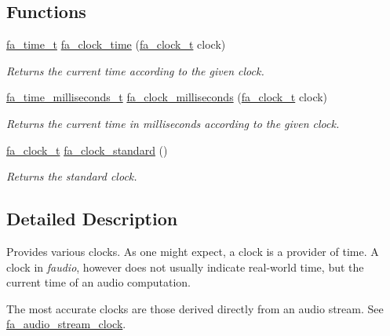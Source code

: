 \subsection*{Functions}
\begin{DoxyCompactItemize}
\item 
\hyperlink{group___fa_time_ga227cc693f20b4873fed11028bcade184}{fa\-\_\-time\-\_\-t} \hyperlink{group___fa_clock_ga18d53d2bcd2ff1618760b9960e40d56d}{fa\-\_\-clock\-\_\-time} (\hyperlink{group___fa_clock_ga20b3a0f49788fbedba140b1d315d2313}{fa\-\_\-clock\-\_\-t} clock)
\begin{DoxyCompactList}\small\item\em Returns the current time according to the given clock. \end{DoxyCompactList}\item 
\hyperlink{group___fa_time_gadebdebeab6c5ba7cd8002d0773635e61}{fa\-\_\-time\-\_\-milliseconds\-\_\-t} \hyperlink{group___fa_clock_gad09133a7293cd31a05d99b8915546a4a}{fa\-\_\-clock\-\_\-milliseconds} (\hyperlink{group___fa_clock_ga20b3a0f49788fbedba140b1d315d2313}{fa\-\_\-clock\-\_\-t} clock)
\begin{DoxyCompactList}\small\item\em Returns the current time in milliseconds according to the given clock. \end{DoxyCompactList}\item 
\hyperlink{group___fa_clock_ga20b3a0f49788fbedba140b1d315d2313}{fa\-\_\-clock\-\_\-t} \hyperlink{group___fa_clock_ga867297b309d28fdf6e47bf259eb6f914}{fa\-\_\-clock\-\_\-standard} ()
\begin{DoxyCompactList}\small\item\em Returns the standard clock. \end{DoxyCompactList}\end{DoxyCompactItemize}


\subsection{Detailed Description}
Provides various clocks. As one might expect, a clock is a provider of time. A clock in {\itshape faudio}, however does not usually indicate real-\/world time, but the current time of an audio computation.

The most accurate clocks are those derived directly from an audio stream. See \hyperlink{group___fa_audio_stream_ga4d3c49d217cb3e8cebea323261997840}{fa\-\_\-audio\-\_\-stream\-\_\-clock}.

